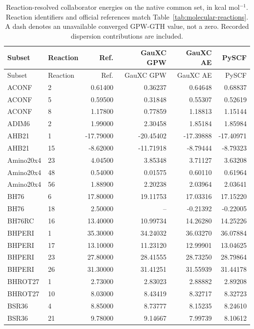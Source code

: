 {\small
\begin{longtable}{llrrrr}
\caption{Reaction-resolved collaborator energies on the native common set, in kcal mol$^{-1}$. Reaction identifiers and official references match Table~\ref{tab:molecular-reactions}. A dash denotes an unavailable converged GPW-GTH value, not a zero. Recorded dispersion contributions are included.}\label{tab:interface-reactions}\\
\toprule
Subset & Reaction & Ref. & GauXC GPW & GauXC AE & PySCF\\
\midrule
\endfirsthead
\toprule
Subset & Reaction & Ref. & GauXC GPW & GauXC AE & PySCF\\
\midrule
\endhead
ACONF & 2 & 0.61400 & 0.36237 & 0.64648 & 0.68837 \\
ACONF & 5 & 0.59500 & 0.31848 & 0.55307 & 0.52619 \\
ACONF & 8 & 1.17800 & 0.77859 & 1.18813 & 1.15144 \\
ADIM6 & 2 & 1.99000 & 2.30458 & 1.85184 & 1.85984 \\
AHB21 & 1 & -17.79000 & -20.45402 & -17.39888 & -17.40971 \\
AHB21 & 15 & -8.62000 & -11.71918 & -8.79444 & -8.79323 \\
Amino20x4 & 23 & 4.04500 & 3.85348 & 3.71127 & 3.63208 \\
Amino20x4 & 48 & 0.54000 & 0.01575 & 0.60110 & 0.61964 \\
Amino20x4 & 56 & 1.88900 & 2.20238 & 2.03964 & 2.03641 \\
BH76 & 6 & 17.80000 & 19.11753 & 17.03316 & 17.15220 \\
BH76 & 18 & 2.50000 & -- & -0.21392 & -0.22005 \\
BH76RC & 16 & 13.40000 & 10.99734 & 14.26280 & 14.25226 \\
BHPERI & 1 & 35.30000 & 34.24032 & 36.03270 & 36.07884 \\
BHPERI & 17 & 13.10000 & 11.23120 & 12.99901 & 13.04625 \\
BHPERI & 23 & 27.80000 & 28.41555 & 28.73250 & 28.79864 \\
BHPERI & 26 & 31.30000 & 31.41251 & 31.55939 & 31.44178 \\
BHROT27 & 1 & 2.73000 & 2.83023 & 2.88882 & 2.89208 \\
BHROT27 & 10 & 8.03000 & 8.43419 & 8.32717 & 8.32723 \\
BSR36 & 4 & 8.85000 & 8.73777 & 8.15235 & 8.24610 \\
BSR36 & 21 & 9.78000 & 9.14667 & 7.99739 & 8.10612 \\

\end{longtable}}
